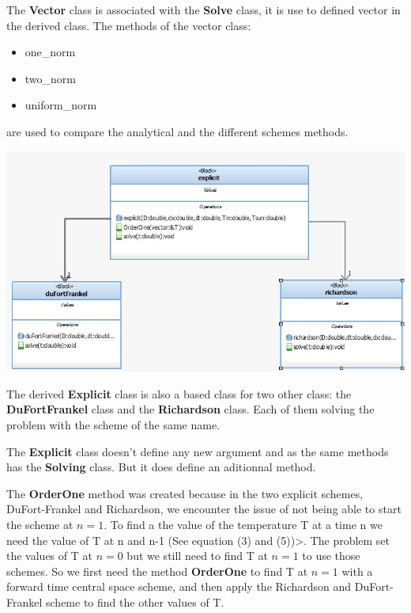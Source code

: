 \documentclass [10 pt, a4 paper]{article}
\begin{document}
The \textbf{Vector} class is associated with the \textbf{Solve} class, it is use to defined 
vector in the derived class.
The methods of the vector class:
\begin{itemize}
    \item one\_norm
    \item two\_norm
    \item uniform\_norm
\end{itemize}
are used to compare the analytical and the different schemes methods.
\begin{center}
    \includegraphics[scale=0.6]{Explicit.JPG}
\end{center}

The derived \textbf{Explicit} class is also a based class for two other class: the \textbf{DuFortFrankel}
class and the \textbf{Richardson} class. Each of them solving the problem with the scheme of the same name.

\vspace{0.3cm}

The \textbf{Explicit} class doesn't define any new argument and as the same methods has the \textbf{Solving}
class. But it does define an aditionnal method. 

The \textbf{OrderOne} method was created because in the two explicit schemes, DuFort-Frankel
and Richardson, we encounter the issue of not being able to start the scheme at $n = 1$.
To find a the value of the temperature T at a time n we need the value of T at n and n-1 (See equation (3) and (5))>.
The problem set the values of T at $n = 0$ but we still need to find T at $n=1$ to use those
schemes. So we first need the method \textbf{OrderOne} to find T at $n = 1$ with a forward time central
space scheme, and then apply the Richardson and DuFort-Frankel scheme to find the other values 
of T.
\end{document}
